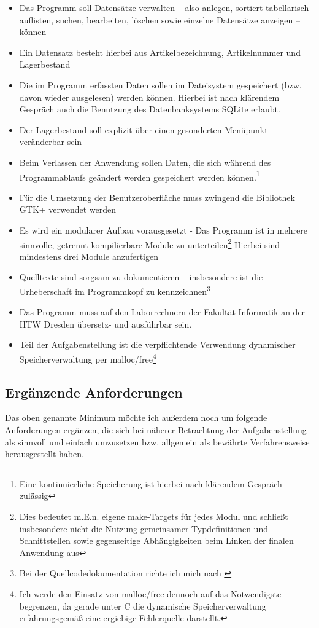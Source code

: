 \begin{itemize}
\item Das Programm soll Datensätze verwalten -- also anlegen, sortiert tabellarisch auflisten, suchen, bearbeiten,
löschen sowie einzelne Datensätze anzeigen -- können
\item Ein Datensatz besteht hierbei aus Artikelbezeichnung, Artikelnummer und Lagerbestand
\item Die im Programm erfassten Daten sollen im Dateisystem gespeichert (bzw. davon wieder ausgelesen) werden können.
Hierbei ist nach klärendem Gespräch auch die Benutzung des Datenbanksystems SQLite erlaubt.
\item Der Lagerbestand soll explizit über einen gesonderten Menüpunkt veränderbar sein
\item Beim Verlassen der Anwendung sollen Daten, die sich während des Programmablaufs geändert werden
gespeichert werden können.\footnote{Eine kontinuierliche Speicherung ist hierbei nach klärendem Gespräch
zulässig}
\item Für die Umsetzung der Benutzeroberfläche muss zwingend die Bibliothek GTK+ verwendet werden
\item Es wird ein modularer Aufbau vorausgesetzt - Das Programm ist in mehrere sinnvolle, getrennt kompilierbare Module
zu unterteilen\footnote{Dies bedeutet m.E.n. eigene make-Targets für jedes Modul und schließt insbesondere nicht die
Nutzung gemeinsamer Typdefinitionen und Schnittstellen sowie gegenseitige Abhängigkeiten beim Linken der finalen
Anwendung aus}
Hierbei sind mindestens drei Module anzufertigen
\item Quelltexte sind sorgsam zu dokumentieren -- insbesondere ist die Urheberschaft im Programmkopf zu
kennzeichnen\footnote{Bei der Quellcodedokumentation richte ich mich nach \cite[Kap.4]{Martin:CleanCode}}
\item Das Programm muss auf den Laborrechnern der Fakultät Informatik an der HTW Dresden übersetz- und ausführbar sein.
\item Teil der Aufgabenstellung ist die verpflichtende Verwendung dynamischer Speicherverwaltung per malloc/free\footnote{
Ich werde den Einsatz von malloc/free dennoch auf das Notwendigste begrenzen, da gerade unter C die dynamische
Speicherverwaltung erfahrungsgemäß eine ergiebige Fehlerquelle darstellt.}
\end{itemize}

\subsection{Ergänzende Anforderungen}
Das oben genannte Minimum möchte ich außerdem noch um folgende Anforderungen ergänzen, die sich bei näherer Betrachtung
der Aufgabenstellung als sinnvoll und einfach umzusetzen bzw. allgemein als bewährte Verfahrensweise herausgestellt haben.

